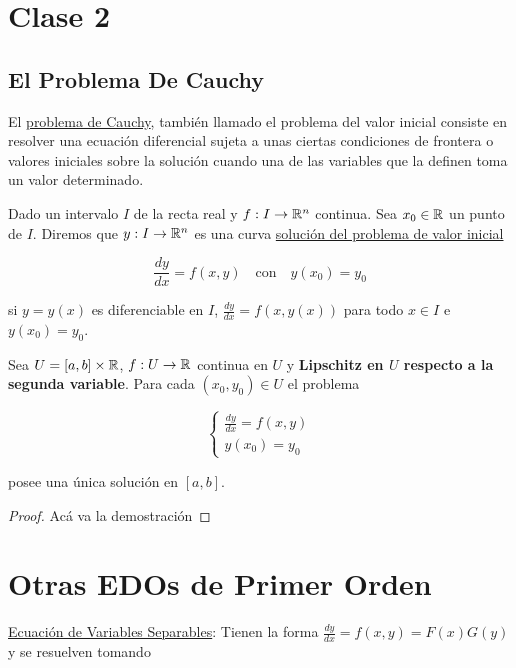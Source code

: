 \section{Clase 2}
\subsection{El Problema De Cauchy}

El \ul{problema de Cauchy}, también llamado el problema del valor inicial consiste en resolver una ecuación diferencial sujeta a unas ciertas condiciones de frontera o valores iniciales sobre la solución cuando una de las variables que la definen toma un valor determinado.

\begin{defn}
    Dado un intervalo $I$ de la recta real y $f: I \rightarrow \mathbb{R}^n$ continua. Sea $x_0 \in \mathbb{R}$ un punto de $I$. Diremos que $y: I \rightarrow \mathbb{R}^n$ es una curva \ul{solución del problema de valor inicial}

    \[
    \frac{dy}{dx} = f(x, y) \quad \text{con} \quad y(x_0) = y_0
    \]

    si $y = y(x)$ es diferenciable en $I$, $\frac{dy}{dx} = f(x, y(x))$ para todo $x \in I$ e $y(x_0) = y_0$.
\end{defn}

\begin{teo}
    Sea $U = [ a, b ] \times \mathbb{R}$, $f: U \rightarrow \mathbb{R}$ continua en $U$ y \textbf{Lipschitz en $U$ respecto a la segunda variable}. Para cada $(x_0, y_0) \in U$ el problema

    \[
    \begin{cases*}
    \frac{\displaystyle dy}{\displaystyle dx} = f(x, y) \\
    y(x_0) = y_0    
    \end{cases*}
    \]

    posee una única solución en $[a, b]$.
\end{teo}

\begin{proof}
    Acá va la demostración
\end{proof}

\section*{Otras EDOs de Primer Orden}

\ul{Ecuación de Variables Separables}: Tienen la forma $\frac{dy}{dx} = f(x, y) = F(x)G(y)$ y se resuelven tomando
    

